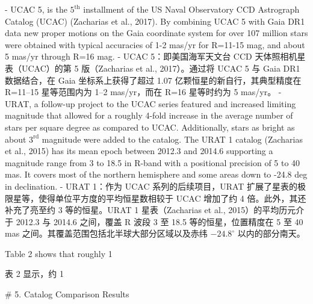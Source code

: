 - UCAC 5, is the  $5^{\text{th}}$  installment of the US Naval Observatory CCD Astrograph Catalog (UCAC) (Zacharias et al., 2017). By combining UCAC 5 with Gaia DR1 data new proper motions on the Gaia coordinate system for over 107 million stars were obtained with typical accuracies of 1-2 mas/yr for R=11-15 mag, and about 5 mas/yr through R=16 mag.
- UCAC 5：即美国海军天文台 CCD 天体照相机星表（UCAC）的第 5 版（Zacharias et al., 2017）。通过将 UCAC 5 与 Gaia DR1 数据结合，在 Gaia 坐标系上获得了超过 1.07 亿颗恒星的新自行，其典型精度在 R=11–15 星等范围内为 1–2 mas/yr，而在 R=16 星等时约为 5 mas/yr。
- URAT, a follow-up project to the UCAC series featured and increased limiting magnitude that allowed for a roughly 4-fold increase in the average number of stars per square degree as compared to UCAC. Additionally, stars as bright as about  $3^{\text{rd}}$  magnitude were added to the catalog. The URAT 1 catalog (Zacharias et al., 2015) has its mean epoch between 2012.3 and 2014.6 supporting a magnitude range from 3 to 18.5 in R-band with a positional precision of 5 to 40 mas. It covers most of the northern hemisphere and some areas down to -24.8 deg in declination.
- URAT 1：作为 UCAC 系列的后续项目，URAT 扩展了星表的极限星等，使得单位平方度的平均恒星数相较于 UCAC 增加了约 4 倍。此外，其还补充了亮至约 3 等的恒星。URAT 1 星表（Zacharias et al., 2015）的平均历元介于 2012.3 与 2014.6 之间，覆盖 R 波段 3 至 18.5 等的恒星，位置精度在 5 至 40 mas 之间。其覆盖范围包括北半球大部分区域以及赤纬 $-24.8^\circ$ 以内的部分南天。

Table 2 shows that roughly 1%

表 2 显示，约 1%

# 5. Catalog Comparison Results

